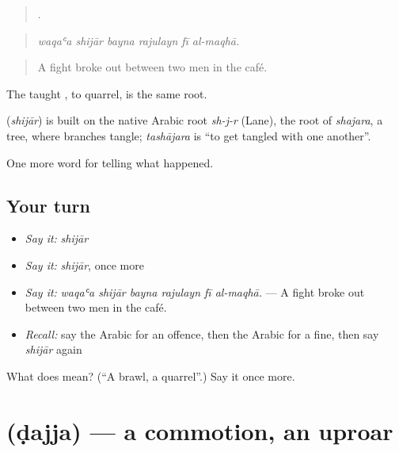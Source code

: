 \begin{quote}
     .
\end{quote}

\begin{quote}
\emph{waqaʿa shijār bayna rajulayn fī al-maqhā.}
\end{quote}

\begin{quote}
A fight broke out between two men in the café.
\end{quote}

The taught , to quarrel, is the same root.

\begin{cousinweb}
\textbf{} (\emph{shijār}) is built on the native Arabic root \emph{sh-j-r} (Lane), the root of \emph{shajara}, a tree, where branches tangle; \emph{tashājara} is \textquotedblleft{}to get tangled with one another\textquotedblright{}.
\end{cousinweb}

\begin{grammarlens}[title={What you've built}]
One more word for telling what happened.
\end{grammarlens}

\subsection*{Your turn}
\begin{itemize}
\raggedright
  \item \emph{Say it:} \emph{shijār}
  \item \emph{Say it:} \emph{shijār}, once more
  \item \emph{Say it:} \emph{waqaʿa shijār bayna rajulayn fī al-maqhā.} — A fight broke out between two men in the café.
  \item \emph{Recall:} say the Arabic for an offence, then the Arabic for a fine, then say \emph{shijār} again
\end{itemize}

\begin{tcolorbox}[breakable,colback=teal!4,colframe=teal!35!black,title={Before you move on}]
What does  mean? (\textquotedblleft{}A brawl, a quarrel\textquotedblright{}.) Say it once more.
\end{tcolorbox}
\section[\texorpdfstring{\ar{ضجة} (ḍajja)}{ضجة (ḍajja)}]{ (ḍajja) — a commotion, an uproar}

